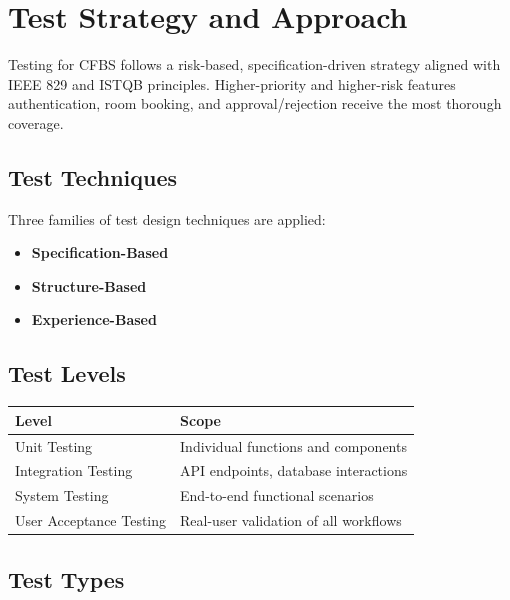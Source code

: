 \documentclass[12pt, a4paper]{article}
\newcommand{\hdrrow}{\rowcolor{HeaderRow}}
\newcommand{\altrow}{\rowcolor{AltRow}}
\begin{document}
\newpage
\section{Test Strategy and Approach}

Testing for CFBS follows a risk-based, specification-driven strategy aligned with IEEE 829 and ISTQB principles. Higher-priority and higher-risk features authentication, room booking, and approval/rejection receive the most thorough coverage.

\subsection{Test Techniques}

Three families of test design techniques are applied:

\begin{itemize}

  \item \textbf{Specification-Based }

  \item \textbf{Structure-Based} 

  \item \textbf{Experience-Based} 
\end{itemize}

\subsection{Test Levels}

\begin{tabularx}{\linewidth}{X X}
\hdrrow
\color{white}\textbf{Level} & \color{white}\textbf{Scope} \\
\midrule
\altrow Unit Testing & Individual functions and components \\
Integration Testing & API endpoints, database interactions \\
\altrow System Testing & End-to-end functional scenarios \\
User Acceptance Testing & Real-user validation of all workflows \\
\end{tabularx}

\subsection{Test Types}
\end{document}
